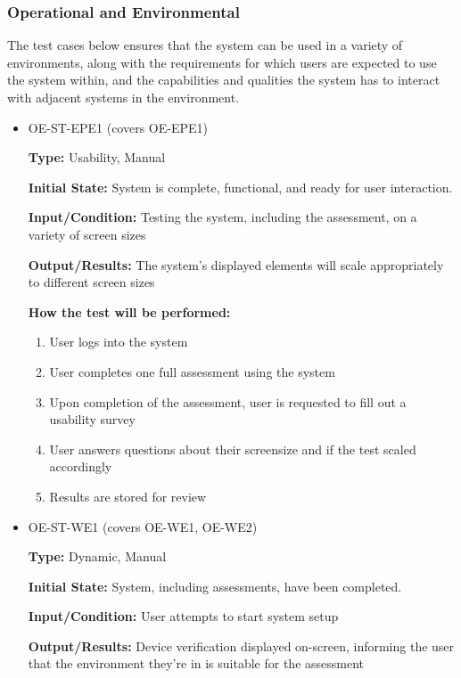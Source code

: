 \documentclass[12pt, titlepage]{article}
\begin{document}
\subsubsection{Operational and Environmental}
\hspace{2em}The test cases below ensures that the system can be used in a variety of environments,
along with the requirements for which users are expected to use the system within, and the capabilities
and qualities the system has to interact with adjacent systems in the environment.

\begin{itemize}
  \item OE-ST-EPE1 (covers OE-EPE1)
  \begin{mdframed}[linewidth=0.5mm]
      \textbf{Type:} Usability, Manual\par
      \textbf{Initial State:} System is complete, functional, and ready for user interaction. \par
      \textbf{Input/Condition:} Testing the system, including the assessment, on a variety of screen sizes \par
      \textbf{Output/Results:} The system's displayed elements will scale appropriately to different screen sizes \par
      \textbf{How the test will be performed:}
      \begin{enumerate}[noitemsep]
        \item User logs into the system
        \item User completes one full assessment using the system
        \item Upon completion of the assessment, user is requested to fill out a usability survey
        \item User answers questions about their screensize and if the test scaled accordingly
        \item Results are stored for review
      \end{enumerate}
  \end{mdframed}
  \item OE-ST-WE1 (covers OE-WE1, OE-WE2)
  \begin{mdframed}[linewidth=0.5mm]
      \textbf{Type:} Dynamic, Manual \par
      \textbf{Initial State:} System, including assessments, have been completed. \par
      \textbf{Input/Condition:} User attempts to start system setup\par
      \textbf{Output/Results:} Device verification displayed on-screen, informing the user that the environment they're in is suitable for the assessment \par

\end{mdframed}
\end{itemize}
\end{document}
